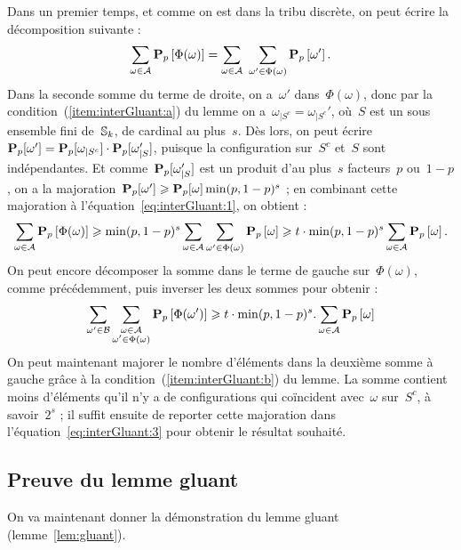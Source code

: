 		\begin{dem}
			Dans un premier temps, et comme on est dans la tribu discrète, on peut écrire la décomposition suivante :
			\begin{equation}\label{eq:interGluant:1}
				\sum_{\omega\in\mathcal{A}}\Pp{\Phi(\omega)} = \sum_{\omega\in\mathcal{A}}\ \sum_{\omega'\in\Phi(\omega)}\Pp{\omega'}.
			\end{equation}
			Dans la seconde somme du terme de droite, on a~$\omega'$ dans~$\Phi(\omega)$, donc par la condition~(\ref{item:interGluant:a}) du lemme on a~$\omega_{|S^c}=\omega_{|S^c}'$, où~$S$ est un sous ensemble fini de~$\mathbb{S}_k$, de cardinal au plus~$s$. Dès lors, on peut écrire~$\bm{\mathrm{P}}_{p}{}[\omega'] = \bm{\mathrm{P}}_{p}{}[\omega_{|S^c}]\cdot\bm{\mathrm{P}}_{p}{}[\omega_{|S}']$, puisque la configuration sur~$S^c$ et~$S$ sont indépendantes. Et comme~$\bm{\mathrm{P}}_{p}{}[\omega_{|S}']$ est un produit d'au plus~$s$ facteurs~$p$ ou~$1-p$, on a la majoration~$\bm{\mathrm{P}}_{p}{}[\omega'] \geqslant \bm{\mathrm{P}}_{p}{}[\omega]\min(p,1-p)^s$ ; en combinant cette majoration à l'équation~\eqref{eq:interGluant:1}, on obtient :
			\begin{equation}\label{eq:interGluant:2}
					\sum_{\omega\in\mathcal{A}}\bm{\mathrm{P}}_{p}\left[\Phi(\omega)\right]
				\geqslant
					\min(p,1-p)^s
					\sum_{\omega\in\mathcal{A}} \sum_{\omega'\in\Phi(\omega)} 
						\bm{\mathrm{P}}_{p}\left[\omega\right]
				\geqslant
					t\cdot\min(p,1-p)^s
					\sum_{\omega\in\mathcal{A}}\bm{\mathrm{P}}_{p}\left[\omega\right].
			\end{equation}
			On peut encore décomposer la somme dans le terme de gauche sur~$\Phi(\omega)$, comme précédemment, puis inverser les deux sommes pour obtenir :
			\begin{equation}\label{eq:interGluant:3}
					\sum_{\omega'\in\mathcal{B}}
					\sum_{\substack{\omega\in\mathcal{A}\\ \omega'\in\Phi(\omega)}}\bm{\mathrm{P}}_{p}\left[\Phi(\omega')\right]
				\geqslant
					t\cdot\min(p,1-p)^s
.					\sum_{\omega\in\mathcal{A}} \bm{\mathrm{P}}_{p}\left[\omega\right]
			\end{equation}
			On peut maintenant majorer le nombre d'éléments dans la deuxième somme à gauche grâce à la condition~(\ref{item:interGluant:b}) du lemme. La somme contient moins d'éléments qu'il n'y a de configurations qui coïncident avec~$\omega$ sur~$S^c$, à savoir~$2^s$ ; il suffit ensuite de reporter cette majoration dans l'équation~\eqref{eq:interGluant:3} pour obtenir le résultat souhaité.
		\end{dem}
	
	\subsection{Preuve du lemme gluant}
		On va maintenant donner la démonstration du lemme gluant (lemme~\ref{lem:gluant}).
